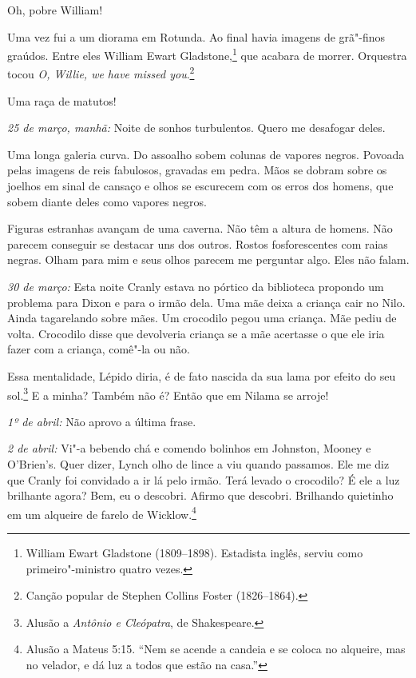 Oh, pobre William!

Uma vez fui a um diorama em Rotunda. Ao final havia imagens de
grã"-finos graúdos. Entre eles William Ewart Gladstone,\footnote{ William
Ewart Gladstone (1809--1898). Estadista inglês, serviu como primeiro"-ministro quatro vezes.} que acabara de morrer. Orquestra tocou
\textit{O, Willie, we have missed you}.\footnote{ Canção popular de Stephen Collins Foster (1826--1864).}

Uma raça de matutos!

\medskip\noindent\textit{25 de março, manhã:} Noite de sonhos turbulentos. Quero me
desafogar deles.

Uma longa galeria curva. Do assoalho sobem colunas de vapores negros.
Povoada pelas imagens de reis fabulosos, gravadas em pedra. Mãos se
dobram sobre os joelhos em sinal de cansaço e olhos se escurecem com os
erros dos homens, que sobem diante deles como vapores negros.

Figuras estranhas avançam de uma caverna. Não têm a altura de homens. Não
parecem conseguir se destacar uns dos outros. Rostos fosforescentes com
raias negras. Olham para mim e seus olhos parecem me perguntar algo.
Eles não falam.

\medskip\noindent\textit{30 de março:} Esta noite Cranly estava no pórtico da biblioteca
propondo um problema para Dixon e para o irmão dela. Uma mãe deixa a
criança cair no Nilo. Ainda tagarelando sobre mães. Um crocodilo pegou
uma criança. Mãe pediu de volta. Crocodilo disse que devolveria criança
se a mãe acertasse o que ele iria fazer com a criança, comê"-la ou não.

Essa mentalidade, Lépido diria, é de fato nascida da sua lama por efeito
do seu sol.\footnote{ Alusão a  \textit{Antônio e Cleópatra}, de Shakespeare.} 
E a minha? Também não é? Então que em Nilama se arroje!   

\medskip\noindent\textit{1º de abril:} Não aprovo a última frase.

\medskip\noindent\textit{2 de abril:} Vi"-a bebendo chá e comendo bolinhos em Johnston,
Mooney e O’Brien’s. Quer dizer, Lynch
olho de lince a viu quando passamos. Ele me diz que Cranly foi
convidado a ir lá pelo irmão. Terá levado o crocodilo? É ele a luz
brilhante agora? Bem, eu o descobri. Afirmo que descobri. Brilhando
quietinho em um alqueire de farelo de Wicklow.\footnote{ Alusão a Mateus 5:15.
“Nem se acende a candeia e se coloca no alqueire, mas no velador, e dá
luz a todos que estão na casa.”}

